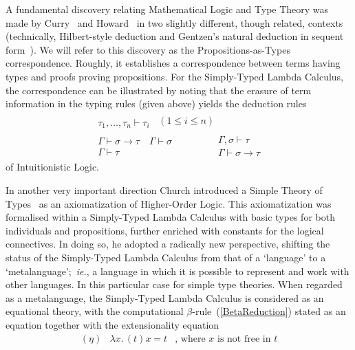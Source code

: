 \documentclass[11pt,twocolumn]{article}
\newcommand{\ie}{\emph{ie.}}
\begin{document}
A fundamental discovery relating Mathematical Logic and Type Theory was made
by Curry~\cite{Curry1934} and Howard~\cite{Howard1969}
in two slightly different, though related, 
contexts (technically, Hilbert-style deduction %
and Gentzen's natural deduction in sequent form~\cite{Gentzen1935}).
We will refer to this discovery as the 
Propositions-as-Types correspondence. %
Roughly, it establishes a correspondence between terms having types and proofs
proving propositions.  For the Simply-Typed Lambda Calculus, the correspondence
can be illustrated by noting that the erasure of term information in the typing 
rules (given above) yields the deduction rules
\[\begin{array}{c}
  \begin{array}{c}
    \\ \hline
    \tau_1,\ldots,\tau_n\vdash \tau_i
  \end{array}
  \enspace(1\leq i\leq n)
  \\[4mm]
  \begin{array}{c}
    \Gamma\vdash \sigma\to\tau
    \quad 
    \Gamma\vdash\sigma 
    \\ \hline
    \Gamma\vdash\tau
  \end{array}
  \qquad\qquad
  \begin{array}{c}
    \Gamma,\sigma\vdash\tau
    \\ \hline
    \Gamma\vdash\sigma\to\tau
  \end{array}
\end{array}
\]
of Intuitionistic %
Logic. %

In another very important direction Church introduced a Simple Theory of
Types~\cite{Church1940} as an axiomatization of Higher-Order Logic.
This axiomatization was formalised within a Simply-Typed Lambda Calculus with basic types
for both individuals and propositions, further enriched with constants for the logical
connectives.  In doing so, he adopted a radically new perspective,
shifting the status of the Simply-Typed Lambda Calculus from that of 
a `language' to a `metalanguage';~\ie, a language in which it is
possible to represent and work with other languages. In this particular case
for simple type theories.  When regarded as a metalanguage, the Simply-Typed
Lambda Calculus is considered as an equational theory, with the
computational \mbox{$\beta$-rule}~(\ref{BetaReduction}) stated as an
equation together with the extensionality equation
  \[\begin{array}{rll}
(\eta) & \lambda x.\,(t)x = t 
& \mbox{, where $x$ is not free in $t$}
  \end{array}\]
\vspace*{-4mm}
\end{document}

